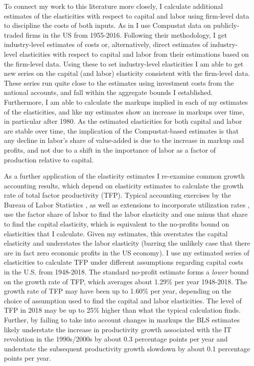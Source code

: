 \documentclass[11pt]{article}
\begin{document}
To connect my work to this literature more closely, I calculate additional estimates of the elasticities with respect to capital and labor using firm-level data to discipline the costs of both inputs. As in \cite{dleu2020} I use Compustat data on publicly-traded firms in the US from 1955-2016. Following their methodology, I get industry-level estimates of costs or, alternatively, direct estimates of industry-level elasticities with respect to capital and labor from their estimations based on the firm-level data. Using these to set industry-level elasticities I am able to get new series on the capital (and labor) elasticity consistent with the firm-level data. These series run quite close to the estimates using investment costs from the national accounts, and fall within the aggregate bounds I established. Furthermore, I am able to calculate the markups implied in each of my estimates of the elasticities, and like \cite{dleu2020} my estimates show an increase in markups over time, in particular after 1980. As the estimated elasticities for both capital and labor are stable over time, the implication of the Compustat-based estimates is that any decline in labor's share of value-added is due to the increase in markup and profits, and not due to a shift in the importance of labor as a factor of production relative to capital.

As a further application of the elasticity estimates I re-examine common growth accounting results, which depend on elasticity estimates to calculate the growth rate of total factor productivity (TFP). Typical accounting exercises by the Bureau of Labor Statistics \citep{blsdata}, as well as extensions to incorporate utilization rates \citep{kfb2006,fernald2014}, use the factor share of labor to find the labor elasticity and one minus that share to find the capital elasticity, which is equivalent to the no-profits bound on elasticities that I calculate. Given my estimates, this overstates the capital elasticity and understates the labor elasticity (barring the unlikely case that there are in fact zero economic profits in the US economy). I use my estimated series of elasticities to calculate TFP under different assumptions regarding capital costs in the U.S. from 1948-2018. The standard no-profit estimate forms a \textit{lower} bound on the growth rate of TFP, which averages about 1.29\% per year 1948-2018. The growth rate of TFP may have been up to 1.60\% per year, depending on the choice of assumption used to find the capital and labor elasticities. The level of TFP in 2018 may be up to 25\% higher than what the typical calculation finds. Further, by failing to take into account changes in markups the BLS estimates likely understate the increase in productivity growth associated with the IT revolution in the 1990s/2000s by about 0.3 percentage points per year and understate the subsequent productivity growth slowdown by about 0.1 percentage points per year. 
\end{document}
